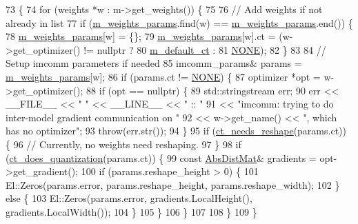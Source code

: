 \begin{DoxyCode}
73                                           \{
74   \textcolor{keywordflow}{for} (weights *w : m->get\_weights()) \{
75 
76     \textcolor{comment}{// Add weights if not already in list}
77     \textcolor{keywordflow}{if} (\hyperlink{classlbann_1_1lbann__callback__imcomm_a32a0319c91aff324cb3468de4f31dd50}{m\_weights\_params}.find(w) == \hyperlink{classlbann_1_1lbann__callback__imcomm_a32a0319c91aff324cb3468de4f31dd50}{m\_weights\_params}.end()) \{
78       \hyperlink{classlbann_1_1lbann__callback__imcomm_a32a0319c91aff324cb3468de4f31dd50}{m\_weights\_params}[w] = \{\};
79       \hyperlink{classlbann_1_1lbann__callback__imcomm_a32a0319c91aff324cb3468de4f31dd50}{m\_weights\_params}[w].ct = (w->get\_optimizer() != \textcolor{keyword}{nullptr} ?
80                                 \hyperlink{classlbann_1_1lbann__callback__imcomm_ac3df687b12721a7278877c303357bc09}{m\_default\_ct} :
81                                 \hyperlink{classlbann_1_1lbann__callback__imcomm_acf7e894b3381e7f9b71020dc73594d6aafa59156bc4d5bcbf6bd80918d062da03}{NONE});
82     \}
83 
84     \textcolor{comment}{// Setup imcomm parameters if needed}
85     imcomm\_params& params = \hyperlink{classlbann_1_1lbann__callback__imcomm_a32a0319c91aff324cb3468de4f31dd50}{m\_weights\_params}[w];
86     \textcolor{keywordflow}{if} (params.ct != \hyperlink{classlbann_1_1lbann__callback__imcomm_acf7e894b3381e7f9b71020dc73594d6aafa59156bc4d5bcbf6bd80918d062da03}{NONE}) \{
87       optimizer *opt = w->get\_optimizer();
88       \textcolor{keywordflow}{if} (opt == \textcolor{keyword}{nullptr}) \{
89         std::stringstream err;
90         err << \_\_FILE\_\_ << \textcolor{stringliteral}{" "} << \_\_LINE\_\_ << \textcolor{stringliteral}{" :: "}
91             << \textcolor{stringliteral}{"imcomm: trying to do inter-model gradient communication on "}
92             << w->get\_name() << \textcolor{stringliteral}{", which has no optimizer"};
93         \textcolor{keywordflow}{throw}(err.str());
94       \}
95       \textcolor{keywordflow}{if} (\hyperlink{classlbann_1_1lbann__callback__imcomm_ab7106f5ee53672f5ef5a58371eb39f0b}{ct\_needs\_reshape}(params.ct)) \{
96         \textcolor{comment}{// Currently, no weights need reshaping.}
97       \}
98       \textcolor{keywordflow}{if} (\hyperlink{classlbann_1_1lbann__callback__imcomm_a8b29853e49c58cf737a741c503737705}{ct\_does\_quantization}(params.ct)) \{
99         \textcolor{keyword}{const} \hyperlink{base_8hpp_a9a697a504ae84010e7439ffec862b470}{AbsDistMat}& gradients = opt->get\_gradient();
100         \textcolor{keywordflow}{if} (params.reshape\_height > 0) \{
101           El::Zeros(params.error, params.reshape\_height, params.reshape\_width);
102         \} \textcolor{keywordflow}{else} \{
103           El::Zeros(params.error, gradients.LocalHeight(), gradients.LocalWidth());
104         \}
105       \}
106     \}
107 
108   \}
109 \}
\end{DoxyCode}
